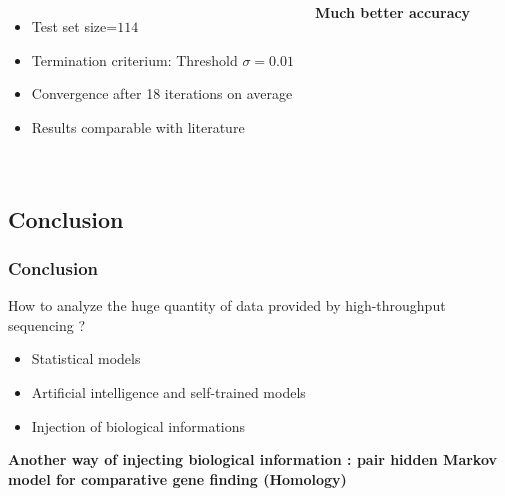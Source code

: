 \documentclass{beamer}[12pt]
\begin{document}
\begin{frame}
\begin{columns}
		\begin{itemize}
			\item Test set size=$114$
			\item Termination criterium: Threshold $\sigma=0.01$
			\item Convergence after 18 iterations on average
			\item Results comparable with literature
		 \end{itemize}
		 
		 \vspace{0.5 cm}
		 
		 \centering\textbf{Much better accuracy}
\end{columns}
\end{frame}

\section*{}
\subsection{Conclusion}

\begin{frame}
\frametitle{Conclusion}
How to analyze the huge quantity of data provided by high-throughput sequencing ? 

\begin{itemize}
		\item Statistical models
		\item Artificial intelligence and self-trained models
		\item Injection of biological informations 
		 \end{itemize}
		 
		 \vspace{0.5 cm}
		 
		 \pause \begin{center}\textbf{Another way of injecting biological information : pair hidden Markov
model for comparative gene finding (Homology)}\end{center}
\end{frame}
\end{document}
